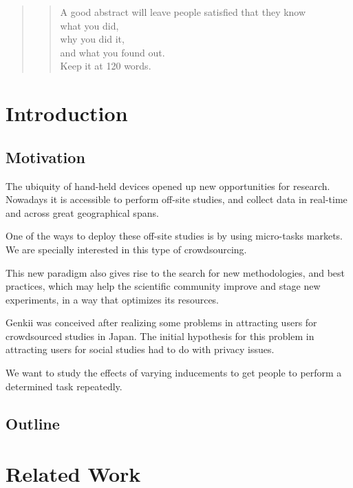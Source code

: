 \documentclass[letterpaper]{article}
\begin{document}
\begin{abstract}
		
\begin{quote}
A good abstract will leave people satisfied that they know
\\ what you did, \\ why you did it, \\ and what you found out. 
\\ Keep it at 120 words.
\end{quote}
\end{abstract}

\section{Introduction}

\subsection{Motivation}



The ubiquity of hand-held devices opened up new opportunities for research. Nowadays it is accessible to perform off-site studies, and collect data in real-time and across great geographical spans.

One of the ways to deploy these off-site studies is by using micro-tasks markets. We are specially interested in this type of crowdsourcing.

This new paradigm also gives rise to the search for new methodologies, and best practices, which may help the scientific community improve and stage new experiments, in a way that optimizes its resources.


 
Genkii was conceived after realizing some problems in attracting users for crowdsourced studies in Japan. The initial hypothesis for this problem in attracting users for social studies had to do with privacy issues.

We want to study the effects of varying inducements to get people to perform a determined task repeatedly.

\subsection{Outline}

\section{Related Work}
\end{document}
